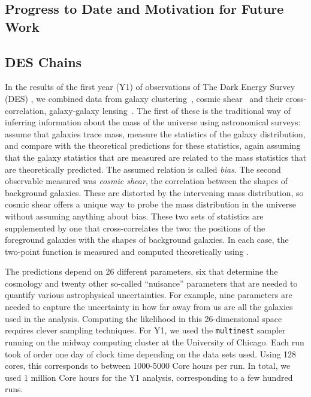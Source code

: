 \documentclass[12pt]{article}
\begin{document}
\begin{small}
\section{Progress to Date and Motivation for Future Work}




\subsection{DES Chains}

In the results of the first year (Y1) of observations of The Dark Energy Survey (DES) \cite{Abbott:2017wau}, we combined data from galaxy clustering~\cite{Elvin-Poole:2017xsf}, cosmic shear~\cite{Troxel:2017xyo} and their cross-correlation, galaxy-galaxy lensing~\cite{Prat:2017goa}. The first of these is the traditional way of inferring information about the mass of the universe using astronomical surveys: assume that galaxies trace mass, measure the statistics of the galaxy distribution, and compare with the theoretical predictions for these statistics, again assuming that the galaxy statistics that are measured are related to the mass statistics that are theoretically predicted. The assumed relation is called \emph{bias}. The second observable measured was \emph{cosmic shear}, the correlation between the shapes of background galaxies. These are distorted by the intervening mass distribution, so cosmic shear offers a unique way to probe the mass distribution in the universe without assuming anything about bias. These two sets of statistics are supplemented by one that cross-correlates the two: the positions of the foreground galaxies with the shapes of background galaxies. In each case, the two-point function is measured and computed theoretically using \cosmosis. 

The predictions depend on 26 different parameters, six that determine the cosmology and twenty other so-called ``nuisance'' parameters that are needed to quantify various astrophysical uncertainties. For example, nine parameters are needed to capture the uncertainty in how far away from us are all the galaxies used in the analysis. Computing the likelihood in this 26-dimensional space requires clever sampling techniques. For Y1, we used the {\tt multinest} sampler~\cite{Feroz:2008xx} running on the midway computing cluster at the University of Chicago. Each run took of order one day of clock time depending on the data sets used. Using 128 cores, this corresponds to between 1000-5000 Core hours per run. In total, we used 1 million Core hours for the Y1 analysis, corresponding to a few hundred runs. 


\end{small}
\end{document}

